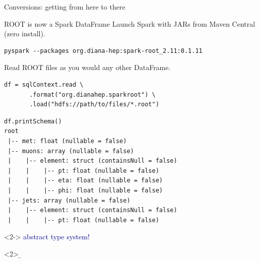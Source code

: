 \documentclass{beamer}
\begin{document}
\begin{frame}{Conversions: getting from here to there}
\vspace{0.5 cm}
\mbox{\hspace{-0.75 cm}}
\end{frame}

\begin{frame}[fragile]{ROOT is now a Spark DataFrame}
\vspace{0.5 cm}
Launch Spark with JARs from Maven Central (zero install).

\vspace{-0.05 cm}
\footnotesize
\begin{verbatim}
pyspark --packages org.diana-hep:spark-root_2.11:0.1.11
\end{verbatim}

\normalsize
\vspace{0.25 cm}
Read ROOT files as you would any other DataFrame.

\footnotesize
\begin{verbatim}
df = sqlContext.read \
       .format("org.dianahep.sparkroot") \
       .load("hdfs://path/to/files/*.root")
\end{verbatim}

\begin{verbatim}
df.printSchema()
root
 |-- met: float (nullable = false)
 |-- muons: array (nullable = false)
 |    |-- element: struct (containsNull = false)
 |    |    |-- pt: float (nullable = false)
 |    |    |-- eta: float (nullable = false)
 |    |    |-- phi: float (nullable = false)
 |-- jets: array (nullable = false)
 |    |-- element: struct (containsNull = false)
 |    |    |-- pt: float (nullable = false)
\end{verbatim}

\vspace{-4 cm}
\begin{uncoverenv}<2->
\hfill\textcolor{darkblue}{\Large abstract type system!}\hspace{-1 cm}
\end{uncoverenv}
\vspace{4 cm}
\end{frame}

\begin{frame}{}


\begin{onlyenv}<2>
\vspace{-6.2 cm}\hfill\b
\end{onlyenv}
\end{frame}
\end{document}
